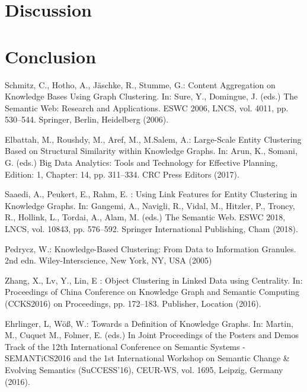 \documentclass[runningheads]{llncs}
\begin{document}
\section{Discussion}
\section{Conclusion}

%
%
%


%
\begin{thebibliography}{8}
Schmitz, C., Hotho, A., J{\"a}schke, R., Stumme, G.: Content Aggregation on Knowledge Bases Using Graph Clustering. In: Sure, Y., Domingue, J. (eds.) The Semantic Web: Research and Applications. ESWC 2006, LNCS, vol. 4011, pp. 530--544.
Springer, Berlin, Heidelberg (2006). 

Elbattah, M., Roushdy, M., Aref, M., M.Salem, A.: Large-Scale Entity Clustering Based on Structural Similarity within Knowledge Graphs. In: Arun, K., Somani, G. (eds.) Big Data Analytics: Tools and Technology for Effective Planning, Edition: 1, Chapter: 14, pp. 311--334. CRC Press Editors (2017). 

Saaedi, A., Peukert, E., Rahm, E.  : Using Link Features for Entity Clustering in Knowledge Graphs. In: Gangemi, A., Navigli, R., Vidal, M., Hitzler, P., Troncy, R., Hollink, L., Tordai, A., Alam, M. (eds.) The Semantic Web. ESWC 2018, LNCS, vol. 10843, pp. 576--592.
Springer International Publishing, Cham (2018). 

Pedrycz, W.: Knowledge-Based Clustering: From Data to Information Granules. 2nd edn. Wiley-Interscience, New York, NY, USA (2005)

Zhang, X., Lv, Y., Lin, E : Object Clustering in Linked Data using Centrality. In: Proceedings of China Conference on Knowledge Graph and Semantic Computing (CCKS2016)
on Proceedings, pp. 172--183. Publisher, Location (2016). 

Ehrlinger, L, W{\"o}{\ss}, W.: Towards a Definition of Knowledge Graphs. In: Martin, M., Cuquet M., Folmer, E. (eds.) In Joint Proceedings of the Posters and Demos Track of the 12th International Conference on Semantic Systems - SEMANTiCS2016 and the 1st International Workshop on Semantic Change \& Evolving Semantics (SuCCESS'16), CEUR-WS, vol. 1695, Leipzig, Germany (2016). 


\end{thebibliography}
\end{document}
